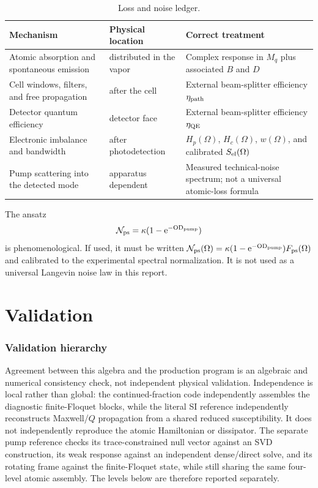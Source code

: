 \documentclass[11pt,a4paper]{article}
\newcommand{\e}{\mathrm e}
\begin{document}
\begin{table}[ht]
\centering
\caption{Loss and noise ledger.}
\label{tab:loss-ledger}
\small
\begin{tabularx}{\textwidth}{L{3.4cm}L{3.2cm}Y}
\toprule
Mechanism & Physical location & Correct treatment\\
\midrule
Atomic absorption and spontaneous emission & distributed in the vapor &
Complex response in $M_q$ plus associated $B$ and $D$\\
Cell windows, filters, and free propagation & after the cell &
External beam-splitter efficiency $\eta_{\rm path}$\\
Detector quantum efficiency & detector face &
External beam-splitter efficiency $\eta_{\rm QE}$\\
Electronic imbalance and bandwidth & after photodetection &
$H_p(\Omega)$, $H_c(\Omega)$, $w(\Omega)$, and calibrated
$S_{\rm el}(\Omega)$\\
Pump scattering into the detected mode & apparatus dependent &
Measured technical-noise spectrum; not a universal atomic-loss formula\\
\bottomrule
\end{tabularx}
\end{table}

The ansatz
\[
\mathcal N_{\rm ps}=\kappa(1-\e^{-{\rm OD}_{\rm pump}})
\]
is phenomenological. If used, it must be written
$\mathcal N_{\rm ps}(\Omega)=
\kappa(1-\e^{-{\rm OD}_{\rm pump}})F_{\rm ps}(\Omega)$ and calibrated to the
experimental spectral normalization. It is not used as a universal Langevin
noise law in this report.

\part{Validation}

\section{Validation hierarchy}

Agreement between this algebra and the production program is an algebraic and
numerical consistency check, not independent physical validation. Independence
is local rather than global: the continued-fraction code independently assembles
the diagnostic finite-Floquet blocks, while the literal SI reference independently
reconstructs Maxwell/$Q$ propagation from a shared reduced susceptibility. It
does not independently reproduce the atomic Hamiltonian or dissipator. The
separate pump reference checks its trace-constrained null vector against an SVD
construction, its weak response against an independent dense/direct solve, and
its rotating frame against the finite-Floquet state, while still sharing the
same four-level atomic assembly. The levels below are therefore reported
separately.
\end{document}
